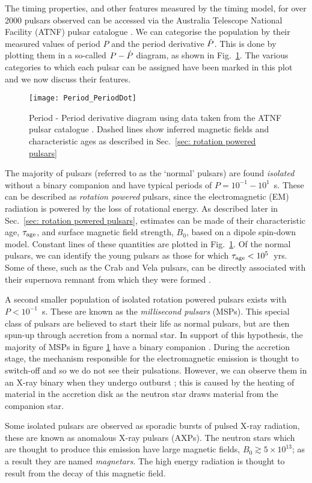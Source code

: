 The timing properties, and other features measured by the timing model, for
over 2000 pulsars observed can be accessed via the Australia Telescope National
Facility (ATNF) pulsar catalogue \citep{ATNF}.  We can categorise the
population by their measured values of period $P$ and the period derivative
$\dot{P}$. This is done by plotting them in a so-called $P - \dot{P}$ diagram, as
shown in Fig.~\ref{fig: Period_PeriodDot}.  The various categories to which
each pulsar can be assigned have been marked in this plot and we now discuss
their features.

\begin{figure}[htb]
    \centering
    \texttt{[image: Period\_PeriodDot]}
    \caption{Period - Period derivative diagram using data taken from the ATNF pulsar
             catalogue \citep{ATNF}. Dashed lines show inferred magnetic fields
             and characteristic ages as described in Sec.~\ref{sec: rotation
             powered pulsars}}
    \label{fig: Period_PeriodDot}
\end{figure}

The majority of pulsars (referred to as the `normal' pulsars) are found
\emph{isolated} without a binary companion and have typical periods of
$P=10^{-1}-10^{1}$~s. These can be described as \emph{rotation powered} pulsars,
since the electromagnetic (EM) radiation is powered by the loss of rotational energy. As
described later in Sec.~\ref{sec: rotation powered pulsars}, estimates can be made
of their characteristic age, $\tau_{\mathrm{age}}$, and surface magnetic field strength,
$B_{0}$, based on a dipole spin-down model. Constant lines of these quantities
are plotted in Fig.~\ref{fig: Period_PeriodDot}. Of the normal pulsars, we
can identify the young pulsars as those for which $\tau_{\mathrm{age}}<10^{5}$~yrs. Some
of these, such as the Crab and Vela pulsars, can be directly associated with their
supernova remnant from which they were formed \citep{Kaspi1996}.

A second smaller population of isolated rotation powered pulsars exists with
$P<10^{-1}$~s. These are known as the \emph{millisecond pulsars} (MSPs). This special
class of pulsars are believed to start their life as normal pulsars, but are then
spun-up through accretion from a normal star. In support of this hypothesis,
the majority of MSPs in figure \ref{fig: Period_PeriodDot} have a binary
companion \citep{wijnands1998millisecond}.  During the accretion stage, the
mechanism responsible for the electromagnetic emission is thought to switch-off
and so we do not see their pulsations. However, we can observe them in an X-ray
binary when they undergo outburst \citep{lewin1997x}; this is caused by the
heating of material in the accretion disk as the neutron star draws material
from the companion star.

Some isolated pulsars are observed as sporadic bursts of pulsed X-ray radiation,
these are known as anomalous X-ray pulsars (AXPs). The neutron stars which are
thought to produce this emission have large magnetic fields, $B_{0}\gtrsim
5\times10^{13}$; as a result they are named \emph{magnetars}. The high energy
radiation is thought to result from the decay of this magnetic field.
